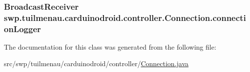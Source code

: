 \subsubsection[{connection\+Logger}]{\setlength{\rightskip}{0pt plus 5cm}Broadcast\+Receiver swp.\+tuilmenau.\+carduinodroid.\+controller.\+Connection.\+connection\+Logger}\label{classswp_1_1tuilmenau_1_1carduinodroid_1_1controller_1_1_connection_ae6c19aae09ad0cc381b2fd17e5f9cf00}


The documentation for this class was generated from the following file\+:\begin{DoxyCompactItemize}
\item 
src/swp/tuilmenau/carduinodroid/controller/\hyperlink{_connection_8java}{Connection.\+java}\end{DoxyCompactItemize}
